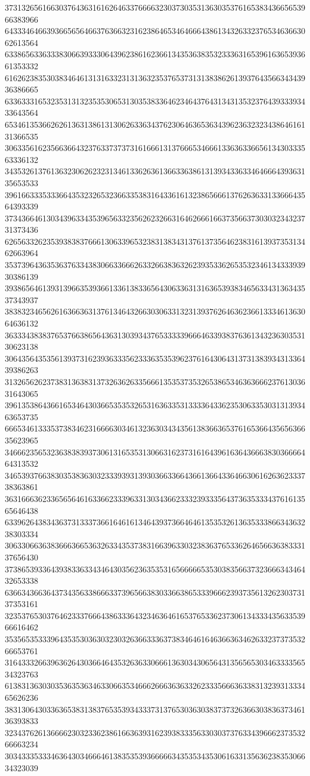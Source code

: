 37313265616630376436316162646337666632303730353136303537616538343665653966383966
64333464663936656564663763663231623864653464666438613432633237653463663062613564
63386563363338306639333064396238616236613435363835323336316539616365393661353332
61626238353038346461313163323131363235376537313138386261393764356634343936386665
63363331653235313132353530653130353833646234643764313431353237643933393433643564
65346135366262613631386131306263363437623064636536343962363232343864616131366535
30633561623566366432376337373731616661313766653466613363633665613430333563336132
34353261376136323062623231346133626361366336386131393433633464666439363135653533
39616633353336643532326532366335383164336161323865666137626363313366643564393339
37343664613034396334353965633235626232663164626661663735663730303234323731373436
62656332623539383837666130633965323831383431376137356462383161393735313462663964
35373964363536376334383066336662633266383632623935336265353234613433393930386139
39386564613931396635393661336138336564306336313163653938346563343136343537343937
38383234656261636636313761346432663030633132313937626463623661333461363064636132
36333438383765376638656436313039343765333339666463393837636134323630353130623138
30643564353561393731623936333562333635353962376164306431373138393431336439386263
31326562623738313638313732636263356661353537353265386534636366623761303631643065
39613538643661653464303665353532653163633531333364336235306335303131393463653735
66653461333537383462316666303461323630343435613836636537616536643565636635623965
34666235653236383839373061316535313066316237316164396163643666383036666464313532
34653937663830353836303233393931393036633664366136643364663061626362333738363861
36316663623365656461633662333963313034366233323933356437363533343761613565646438
63396264383436373133373661646161346439373664646135353261363533386634363238303334
30633066363836663665363263343537383166396330323836376533626465663638333137656430
37386539336439383363343464303562363535316566666535303835663732366634346432653338
63663436636437343563386663373965663830336638653339666239373561326230373137353161
32353765303764623337666438633364323463646165376533623730613433343563353966616462
35356535333964353530363032303263663336373834646164636636346263323737353266653761
31643332663963626430366464353263633066613630343065643135656530346333356534323763
61383136303035363536346330663534666266636363326233356663633831323931333465626236
38313064303363653831383765353934333731376530363038373732636630383637346136393833
32343762613666623032336238616636393162393833356330303737633439666237353266663234
30343335333463643034666461383535393666663435353435306163313563623835306634323039
